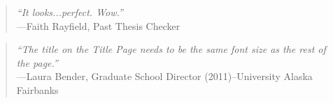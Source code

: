 \vspace{2in}

\begin{quotation}
  {\it ``It looks...perfect.  Wow.''} \\
  \hspace*{1in}---Faith Rayfield, Past Thesis Checker
\end{quotation}

\vspace{1in}

\begin{quotation}
  {\it ``The title on the Title Page needs to be the same font size as the rest of the page.''} \\ 
  \hspace*{1in}---Laura Bender, Graduate School Director (2011)--University Alaska Fairbanks
\end{quotation}
